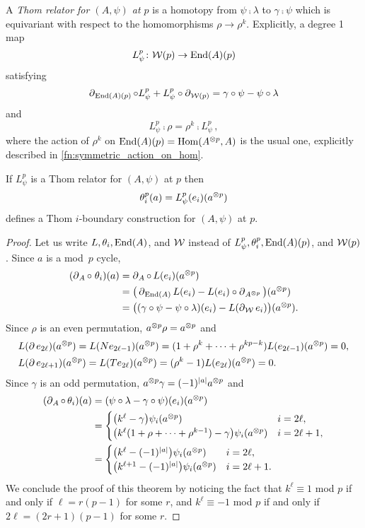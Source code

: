 A \textit{Thom relator for $(A, \psi)$ at $p$} is a homotopy from $\psi \comp \lambda$ to $\gamma \comp \psi$ which is equivariant with respect to the homomorphisms $\rho \to \rho^k$.
Explicitly, a degree 1 map
\[
L_\psi^p \colon \mathcal{W}(p) \to \mathrm{End}(A)(p)
\]
satisfying
\[
\operatorname{\partial}_{\mathrm{End}(A)(p)} \mathbin{\circ} L_\psi^p + L_\psi^p \mathbin{\circ} \operatorname{\partial}_{\mathcal{W}(p)} = \gamma \mathbin{\circ} \psi - \psi \mathbin{\circ} \lambda
\]
and
\[
L_\psi^p \comp \rho = \rho^k \comp L_\psi^p \,,
\]
where the action of $\rho^k$ on $\mathrm{End}(A)(p) = \mathrm{Hom}(A^{\otimes p}, A)$ is the usual one, explicitly described in \cref{fn:symmetric_action_on_hom}.

\begin{theorem}
	If $L_\psi^p$ is a Thom relator for $(A, \psi)$ at $p$ then
	\[
	\theta_i^p(a) = L_\psi^p(e_i)(a^{\otimes p})
	\]
	defines a Thom $i$-boundary construction for $(A, \psi)$ at $p$.
\end{theorem}

\begin{proof}
	Let us write $L,\theta_i, \mathrm{End}(A)$, and $\mathcal{W}$ instead of $L_\psi^p, \theta_i^p, \mathrm{End}(A)(p)$, and $\mathcal{W}(p)$.
	Since $a$ is a mod~$p$ cycle,
	\begin{align*}
		(\operatorname{\partial}_A \mathbin{\circ}\; \theta_i)(a) & =
		\operatorname{\partial}_A \mathbin{\circ}\, L(e_i)(a^{\otimes p}) \\ & =
		\big(\operatorname{\partial}_{\mathrm{End}(A)} L(e_i) - L(e_i) \mathbin{\circ} \operatorname{\partial}_{A^{\otimes p}} \big)(a^{\otimes p})\\ & =
		\big((\gamma \mathbin{\circ} \psi - \psi \mathbin{\circ} \lambda)(e_i) - L(\operatorname{\partial}_{\mathcal{W}} e_i)\big) (a^{\otimes p}).
	\end{align*}
	Since $\rho$ is an even permutation, $a^{\otimes p} \rho = a^{\otimes p}$ and
	\begin{align*}
		&L(\operatorname{\partial} e_{2\ell})(a^{\otimes p}) = L(N e_{2\ell-1})(a^{\otimes p}) = (1+\rho^k+\dots+\rho^{kp-k})L(e_{2\ell-1}) (a^{\otimes p}) = 0, \\
		&L(\operatorname{\partial} e_{2\ell+1})(a^{\otimes p}) = L(T e_{2\ell})(a^{\otimes p}) = (\rho^k - 1) L(e_{2\ell})(a^{\otimes p}) = 0.
	\end{align*}
	Since $\gamma$ is an odd permutation, $a^{\otimes p} \gamma = (-1)^{\lvert a\rvert} a^{\otimes p}$ and
	\begin{align*}
		(\operatorname{\partial}_A \mathbin{\circ}\, \theta_i)(a) & =
		(\psi \mathbin{\circ} \lambda - \gamma \mathbin{\circ} \psi)(e_i)(a^{\otimes p}) \\ & =
		\begin{cases}
			\big(k^\ell - \gamma\big) \psi_i(a^{\otimes p}) & i = 2\ell, \\
			\big(k^\ell (1+\rho+\dots+\rho^{k-1}) - \gamma\big) \psi_i(a^{\otimes p}) & i = 2\ell+1,
		\end{cases}
		\\ & =
		\begin{cases}
			\big(k^\ell - (-1)^{\lvert a\rvert}\big) \psi_i(a^{\otimes p}) & i = 2\ell, \\
			\big(k^{\ell+1} - (-1)^{\lvert a\rvert}\big) \psi_i(a^{\otimes p}) & i = 2\ell+1.
		\end{cases}
	\end{align*}
	We conclude the proof of this theorem by noticing the fact that $k^\ell \equiv 1$ mod $p$ if and only if $\ell = r(p-1)$ for some $r$, and $k^\ell \equiv -1$ mod $p$ if and only if $2\ell = (2r+1)(p-1)$ for some $r$.
\end{proof}

